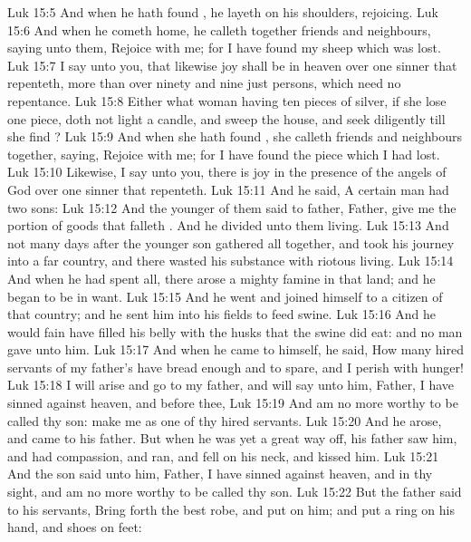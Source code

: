 \vs Luk 15:5 And when he hath found , he layeth  on his shoulders, rejoicing.
\vs Luk 15:6 And when he cometh home, he calleth together  friends and neighbours, saying unto them, Rejoice with me; for I have found my sheep which was lost.
\vs Luk 15:7 I say unto you, that likewise joy shall be in heaven over one sinner that repenteth, more than over ninety and nine just persons, which need no repentance.
\vs Luk 15:8 Either what woman having ten pieces of silver, if she lose one piece, doth not light a candle, and sweep the house, and seek diligently till she find ?
\vs Luk 15:9 And when she hath found , she calleth  friends and  neighbours together, saying, Rejoice with me; for I have found the piece which I had lost.
\vs Luk 15:10 Likewise, I say unto you, there is joy in the presence of the angels of God over one sinner that repenteth.
\vs Luk 15:11 And he said, A certain man had two sons:
\vs Luk 15:12 And the younger of them said to  father, Father, give me the portion of goods that falleth . And he divided unto them  living.
\vs Luk 15:13 And not many days after the younger son gathered all together, and took his journey into a far country, and there wasted his substance with riotous living.
\vs Luk 15:14 And when he had spent all, there arose a mighty famine in that land; and he began to be in want.
\vs Luk 15:15 And he went and joined himself to a citizen of that country; and he sent him into his fields to feed swine.
\vs Luk 15:16 And he would fain have filled his belly with the husks that the swine did eat: and no man gave unto him.
\vs Luk 15:17 And when he came to himself, he said, How many hired servants of my father's have bread enough and to spare, and I perish with hunger!
\vs Luk 15:18 I will arise and go to my father, and will say unto him, Father, I have sinned against heaven, and before thee,
\vs Luk 15:19 And am no more worthy to be called thy son: make me as one of thy hired servants.
\vs Luk 15:20 And he arose, and came to his father. But when he was yet a great way off, his father saw him, and had compassion, and ran, and fell on his neck, and kissed him.
\vs Luk 15:21 And the son said unto him, Father, I have sinned against heaven, and in thy sight, and am no more worthy to be called thy son.
\vs Luk 15:22 But the father said to his servants, Bring forth the best robe, and put  on him; and put a ring on his hand, and shoes on  feet:
